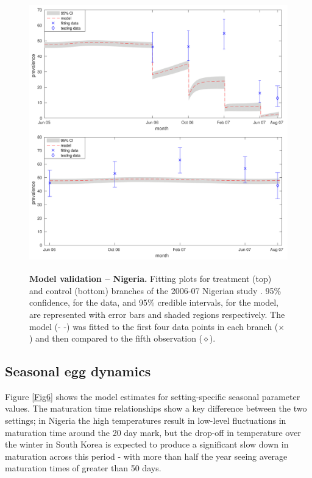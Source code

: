 \begin{figure}[!h]
\includegraphics[height=12cm]{Project/Figures/STH/Fig4.pdf}
\caption{{\bf Model validation -- Nigeria.}
Fitting plots for treatment (top) and control (bottom) branches of the 2006-07 Nigerian study \cite{Kirwan}. 95\% confidence, for the data, and 95\% credible intervals, for the model, are represented with error bars and shaded regions respectively. The model (- -) was fitted to the first four data points in each branch ($\times$) and then compared to the fifth observation ($\diamond$).}
\label{Fig4}
\end{figure} 

\subsection[Egg dynamics]{Seasonal egg dynamics}

Figure \ref{Fig6} shows the model estimates for setting-specific seasonal parameter values. The maturation time relationships show a key difference between the two settings; in Nigeria the high temperatures result in low-level fluctuations in maturation time around the 20 day mark, but the drop-off in temperature over the winter in South Korea is expected to produce a significant slow down in maturation across this period - with more than half the year seeing average maturation times of greater than 50 days.

